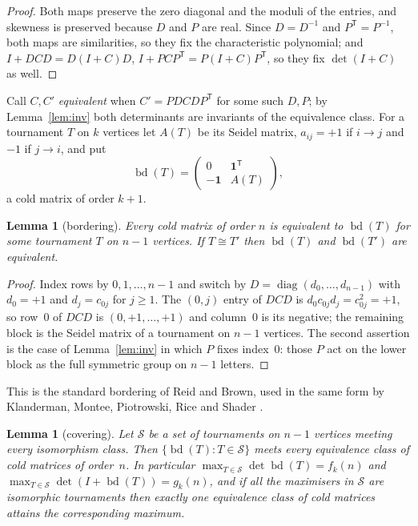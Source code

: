 \documentclass[11pt]{amsart}
\newtheorem{lemma}[theorem]{Lemma}
\theoremstyle{remark}
\begin{document}
\begin{proof}
Both maps preserve the zero diagonal and the moduli of the entries, and skewness is
preserved because $D$ and $P$ are real. Since $D=D^{-1}$ and $P^{\mathsf T}=P^{-1}$, both
maps are similarities, so they fix the characteristic polynomial; and
$I+DCD=D(I+C)D$, $I+PCP^{\mathsf T}=P(I+C)P^{\mathsf T}$, so they fix $\det(I+C)$ as well.
\end{proof}

Call $C,C'$ \emph{equivalent} when $C'=PDCDP^{\mathsf T}$ for some such $D,P$; by
Lemma~\ref{lem:inv} both determinants are invariants of the equivalence class. For a
tournament $T$ on $k$ vertices let $A(T)$ be its Seidel matrix, $a_{ij}=+1$ if $i\to j$
and $-1$ if $j\to i$, and put
\[
  \operatorname{bd}(T)=
  \begin{pmatrix} 0 & \mathbf 1^{\mathsf T}\\ -\mathbf 1 & A(T)\end{pmatrix},
\]
a cold matrix of order $k+1$.

\begin{lemma}[bordering]\label{lem:border}
Every cold matrix of order $n$ is equivalent to $\operatorname{bd}(T)$ for some tournament
$T$ on $n-1$ vertices. If $T\cong T'$ then $\operatorname{bd}(T)$ and
$\operatorname{bd}(T')$ are equivalent.
\end{lemma}

\begin{proof}
Index rows by $0,1,\dots,n-1$ and switch by $D=\operatorname{diag}(d_0,\dots,d_{n-1})$ with
$d_0=+1$ and $d_j=c_{0j}$ for $j\ge1$. The $(0,j)$ entry of $DCD$ is
$d_0c_{0j}d_j=c_{0j}^2=+1$, so row~$0$ of $DCD$ is $(0,+1,\dots,+1)$ and column~$0$ is its
negative; the remaining block is the Seidel matrix of a tournament on $n-1$ vertices. The
second assertion is the case of Lemma~\ref{lem:inv} in which $P$ fixes index~$0$: those
$P$ act on the lower block as the full symmetric group on $n-1$ letters.
\end{proof}

This is the standard bordering of Reid and Brown, used in the same form by Klanderman,
Montee, Piotrowski, Rice and Shader \cite{Klanderman2025}.

\begin{lemma}[covering]\label{lem:cover}
Let $\mathcal S$ be a set of tournaments on $n-1$ vertices meeting every isomorphism
class. Then $\{\operatorname{bd}(T):T\in\mathcal S\}$ meets every equivalence class of cold
matrices of order~$n$. In particular $\max_{T\in\mathcal S}\det\operatorname{bd}(T)=f_k(n)$
and $\max_{T\in\mathcal S}\det(I+\operatorname{bd}(T))=g_k(n)$, and if all the maximisers in
$\mathcal S$ are isomorphic tournaments then exactly one equivalence class of cold
matrices attains the corresponding maximum.
\end{lemma}
\end{document}
